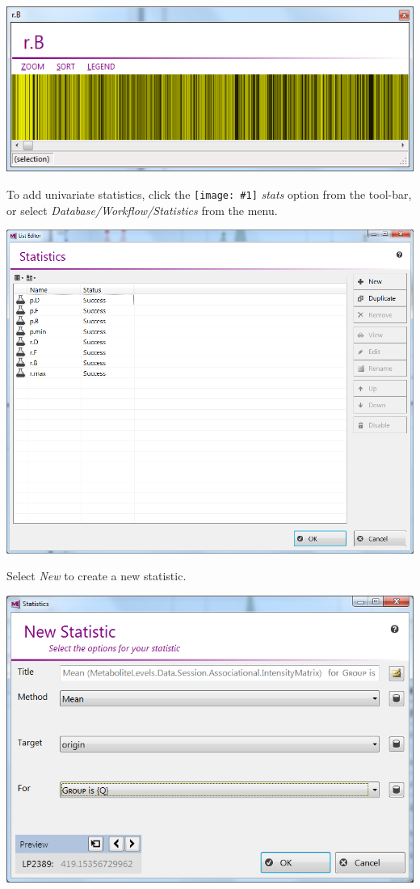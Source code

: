 \documentclass[11pt,a4paper]{article}
\newcommand{\menu}[1]{ \flqq\textit{#1}\frqq}
\newcommand{\icon}[1]{\texttt{[image: \#1]}}
\begin{document}
\begin{center}
\includegraphics[max width=0.7\linewidth]{Images/userguide/heatmap}
\end{center}

To add univariate statistics, click the \icon{stats} \menu{stats} option from the tool-bar, or select \menu{Database/Workflow/Statistics} from the menu.

\begin{center}
\includegraphics[max width=0.7\linewidth]{"Images/userguide/statistics list"}
\end{center}

Select \menu{New} to create a new statistic.

\begin{center}
	\includegraphics[max width=0.7\linewidth]{"Images/userguide/new statistic"}
\end{center}
\end{document}
